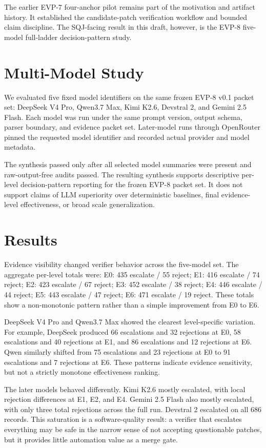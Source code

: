 \documentclass[pdflatex,sn-basic]{sn-jnl}
\begin{document}
The earlier EVP-7 four-anchor pilot remains part of the motivation and
artifact history. It established the candidate-patch verification workflow and
bounded claim discipline. The SQJ-facing result in this draft, however, is the
EVP-8 five-model full-ladder decision-pattern study.

\section{Multi-Model Study}

We evaluated five fixed model identifiers on the same frozen EVP-8 v0.1 packet
set: DeepSeek V4 Pro, Qwen3.7 Max, Kimi K2.6, Devstral 2, and Gemini 2.5
Flash. Each model was run under the same prompt version, output schema, parser
boundary, and evidence packet set. Later-model runs through OpenRouter pinned
the requested model identifier and recorded actual provider and model metadata.

The synthesis passed only after all selected model summaries were present and
raw-output-free audits passed. The resulting synthesis supports descriptive
per-level decision-pattern reporting for the frozen EVP-8 packet set. It does
not support claims of LLM superiority over deterministic baselines, final
evidence-level effectiveness, or broad scale generalization.

\section{Results}

Evidence visibility changed verifier behavior across the five-model set. The
aggregate per-level totals were: E0: 435 escalate / 55 reject; E1: 416 escalate / 74 reject; E2: 423 escalate / 67 reject; E3: 452 escalate / 38 reject; E4: 446 escalate / 44 reject; E5: 443 escalate / 47 reject; E6: 471 escalate / 19 reject. These totals show a
non-monotonic pattern rather than a simple improvement from E0 to E6.

DeepSeek V4 Pro and Qwen3.7 Max showed the clearest level-specific variation.
For example, DeepSeek produced 66 escalations and 32 rejections at E0, 58
escalations and 40 rejections at E1, and 86 escalations and 12 rejections at
E6. Qwen similarly shifted from 75 escalations and 23 rejections at E0 to 91
escalations and 7 rejections at E6. These patterns indicate evidence
sensitivity, but not a strictly monotone effectiveness ranking.

The later models behaved differently. Kimi K2.6 mostly escalated, with local
rejection differences at E1, E2, and E4. Gemini 2.5 Flash also mostly
escalated, with only three total rejections across the full run. Devstral 2
escalated on all 686 records. This saturation is a software-quality result:
a verifier that escalates everything may be safe in the narrow sense of not
accepting questionable patches, but it provides little automation value as a
merge gate.
\end{document}
